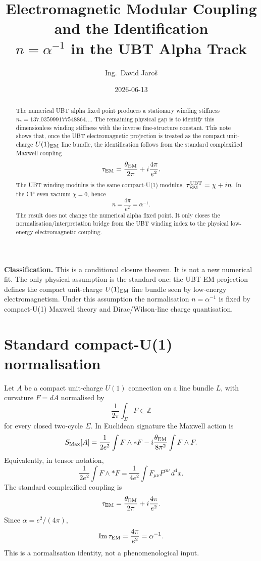 \documentclass[12pt,a4paper]{article}
\title{Electromagnetic Modular Coupling and the Identification\\
       \large $n = \alpha^{-1}$ in the UBT Alpha Track}
\author{Ing.\ David Jaro\v{s}}
\date{2026-06-13}
\begin{document}
\maketitle
\fi

\begin{abstract}
The numerical UBT alpha fixed point produces a stationary winding stiffness
\(n_*=137.035999177548864\ldots\).  The remaining physical gap is to identify
this dimensionless winding stiffness with the inverse fine-structure constant.
This note shows that, once the UBT electromagnetic projection is treated as the
compact unit-charge \(U(1)_{\rm EM}\) line bundle, the identification follows
from the standard complexified Maxwell coupling
\[
  \tau_{\rm EM}=\frac{\theta_{\rm EM}}{2\pi}+i\frac{4\pi}{e^2}.
\]
The UBT winding modulus is the same compact-U(1) modulus,
\(\tau^{\rm UBT}_{\rm EM}=\chi+i n\).  In the CP-even vacuum \(\chi=0\), hence
\[
  n = \frac{4\pi}{e^2}=\alpha^{-1}.
\]
The result does not change the numerical alpha fixed point.  It only closes the
normalisation/interpretation bridge from the UBT winding index to the physical
low-energy electromagnetic coupling.
\end{abstract}

\begin{statusbox}
\textbf{Classification.} This is a conditional closure theorem.  It is not a
new numerical fit.  The only physical assumption is the standard one: the UBT
EM projection defines the compact unit-charge \(U(1)_{\rm EM}\) line bundle seen
by low-energy electromagnetism.  Under this assumption the normalisation
\(n=\alpha^{-1}\) is fixed by compact-U(1) Maxwell theory and Dirac/Wilson-line
charge quantisation.
\end{statusbox}

\section{Standard compact-U(1) normalisation}

Let \(A\) be a compact unit-charge \(U(1)\) connection on a line bundle \(L\),
with curvature \(F=dA\) normalised by
\[
  \frac{1}{2\pi}\int_{\Sigma}F \in \mathbb Z
\]
for every closed two-cycle \(\Sigma\).  In Euclidean signature the Maxwell
action is
\begin{equation}
  S_{\rm Max}[A]
  =
  \frac{1}{2e^2}\int F\wedge *F
  - i\frac{\theta_{\rm EM}}{8\pi^2}\int F\wedge F .
  \label{eq:stdMaxwell}
\end{equation}
Equivalently, in tensor notation,
\[
  \frac{1}{2e^2}\int F\wedge *F
  =
  \frac{1}{4e^2}\int F_{\mu\nu}F^{\mu\nu}\,d^4x .
\]
The standard complexified coupling is
\begin{equation}
  \tau_{\rm EM}
  =
  \frac{\theta_{\rm EM}}{2\pi}
  + i\frac{4\pi}{e^2}.
  \label{eq:tauEM}
\end{equation}
Since \(\alpha=e^2/(4\pi)\),
\begin{equation}
  {\rm Im}\,\tau_{\rm EM}=\frac{4\pi}{e^2}=\alpha^{-1}.
  \label{eq:imalpha}
\end{equation}
This is a normalisation identity, not a phenomenological input.
\end{document}
